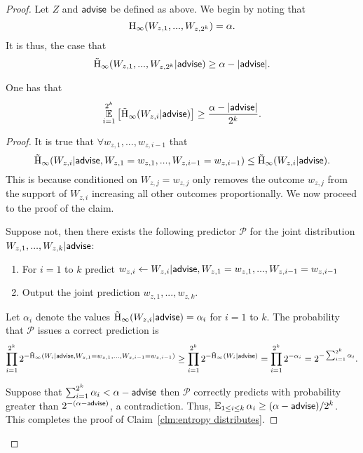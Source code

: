 \begin{proof}
Let $Z$ and ${\mathsf{advise}}$ be defined as above. We begin by noting that 
\[
\mathrm{H}_\infty(W_{z, 1},..., W_{z, 2^k})=\alpha.
\]
 It is thus, the case that 
\[
\tilde{\mathrm{H}}_\infty(W_{z, 1},..., W_{z, 2^ k} | {\mathsf{advise}}) \ge \alpha - |{\mathsf{advise}}|.
\]
\begin{claim}
One has that 
\begin{align*}
\operatorname*{\mathbb{E}}_{i=1}^{2^k} \left[\tilde{\mathrm{H}}_\infty(W_{z, i} | {\mathsf{advise}})\right] \ge \frac{\alpha - |{\mathsf{advise}}|}{2^k}.
\end{align*}
\label{clm:entropy distributes}
\end{claim}
\begin{proof}
It is true that $\forall w_{z,1},..., w_{z,i-1}$ that 
\[
\tilde{\mathrm{H}}_\infty(W_{z,i} | {\mathsf{advise}}, W_{z, 1}=w_{z,1},..., W_{z,i-1}=w_{z,i-1}) \le \tilde{\mathrm{H}}_\infty(W_{z,i} | {\mathsf{advise}}).
\]
This is because conditioned on $W_{z, j} =w_{z,j}$ only removes the outcome $w_{z,j}$ from the support of $W_{z,i}$ increasing all other outcomes proportionally.  
We now proceed to the proof of the claim. 

Suppose not, then there exists the following predictor $\mathcal{P}$ for the joint distribution $W_{z, 1},..., W_{z, k} | {\mathsf{advise}}$:
\begin{enumerate}
\item For $i=1$ to $k$ predict $w_{z,i}\leftarrow W_{z, i}| {\mathsf{advise}}, W_{z,1}=w_{z,1},..., W_{z,i-1}=w_{z,i-1}$
\item Output the joint prediction $w_{z,1},..., w_{z, k}$.  
\end{enumerate}
Let $\alpha_i$ denote the values $\tilde{\mathrm{H}}_\infty(W_{z,i}| {\mathsf{advise}}) = \alpha_i$ for $i=1$ to $k$. 
The probability that $\mathcal{P}$ issues a correct prediction is
\begin{align*}
\prod_{i=1}^{2^k} 2^{-\tilde{\mathrm{H}}_\infty(W_i | {\mathsf{advise}},  W_{z,1}=w_{z,1},..., W_{z,i-1}=w_{z,i-1})} \ge \prod_{i=1}^{2^k} 2^{-\tilde{\mathrm{H}}_\infty(W_i | {\mathsf{advise}})} = \prod_{i=1}^{2^k} 2^{-\alpha_i}  = 2^{-\sum_{i=1}^{2^k} \alpha_i}.
\end{align*}

\noindent
Suppose that $\sum_{i=1}^{2^k} \alpha_i < \alpha-{\mathsf{advise}}$ then $\mathcal{P}$ correctly predicts with probability greater than $2^{-(\alpha-{\mathsf{advise}})}$, a contradiction.  Thus, $\operatorname*{\mathbb{E}}_{1\le i\le k} \alpha_i \ge (\alpha-{\mathsf{advise}})/2^k$. 
This completes the proof of Claim~\ref{clm:entropy distributes}.
\end{proof}


\end{proof}
